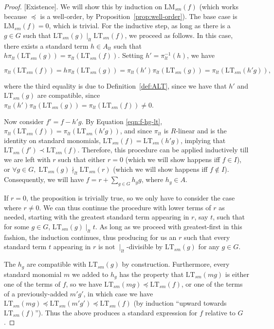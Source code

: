 \documentclass[11pt,reqno]{amsart}
\newcommand{\ltdivides}{\mid_{lt}}
\newcommand{\lmsm}{\text{LM}_{sm}}
\newcommand{\ltsm}{\text{LT}_{sm}}
\theoremstyle{definition}
\numberwithin{equation}{section}
\begin{document}
\begin{proof}

[Existence]. We will show this by induction on $\lmsm(f)$ (which works because $\preceq$ is a well-order, by Proposition~\ref{prop:well-order}). The base case is $\lmsm(f) = 0$, which is trivial. For the inductive step, as long as there is a $g \in G$ such that $\ltsm(g) \ltdivides \ltsm(f)$, we proceed as follows. In this case, there exists a standard term $h \in A_{lt}$ such that $h\pi_{lt}(\ltsm(g)) = \pi_{lt}(\ltsm(f))$. Setting $h' = \pi_{lt}^{-1}(h)$, we have

\begin{equation}
\label{eqn:f-hg-lt}
\pi_{lt}(\ltsm(f)) = h\pi_{lt}(\ltsm(g)) = \pi_{lt}(h')\pi_{lt}(\ltsm(g)) = \pi_{lt}(\ltsm(h'g)),
\end{equation} 

where the third equality is due to Definition~\ref{def:ALT}, since we have that $h'$ and $\ltsm(g)$ are compatible, since $\pi_{lt}(h') \pi_{lt}(\ltsm(g)) = \pi_{lt}(\ltsm(f)) \neq 0$.

Now consider $f' = f - h'g$. By Equation \eqref{eqn:f-hg-lt}, $\pi_{lt}(\ltsm(f)) = \pi_{lt}(\ltsm(h'g))$, and since $\pi_{lt}$ is $R$-linear and is the identity on standard monomials, $\ltsm(f) = \ltsm(h'g)$, implying that $\ltsm(f') \prec \ltsm(f)$. Therefore, this procedure can be applied inductively till we are left with $r$ such that either $r=0$ (which we will show happens iff $f \in I$), or $\forall g \in G,\; \ltsm(g) \nmid_{lt} \ltsm(r)$ (which we will show happens iff $f \not\in I$). Consequently, we will have $f = r + \sum_{g \in G} h_gg$, where $h_g \in A$. 

If $r = 0$, the proposition is trivially true, so we only have to consider the case where $r \neq 0$. We can thus continue the procedure with lower terms of $r$ as needed, starting with the greatest standard term appearing in $r$, say $t$, such that for some $g \in G$, $\ltsm(g) \ltdivides t$. As long as we proceed with greatest-first in this fashion, the induction continues, thus producing for us an $r$ such that every standard term $t$ appearing in $r$ is not $\ltdivides$-divisible by $\ltsm(g)$ for any $g \in G$.

The $h_g$ are compatible with $\ltsm(g)$ by construction. Furthermore, every standard monomial $m$ we added to $h_g$ has the property that $\ltsm(mg)$ is either one of the terms of $f$, so we have $\ltsm(mg) \preceq \ltsm(f)$, or one of the terms of a previously-added $m'g'$, in which case we have $\ltsm(mg) \preceq \ltsm(m'g') \preceq \ltsm(f)$ (by induction ``upward towards $\ltsm(f)$''). Thus the above produces a standard expression for $f$ relative to $G$.


\end{proof}
\end{document}

